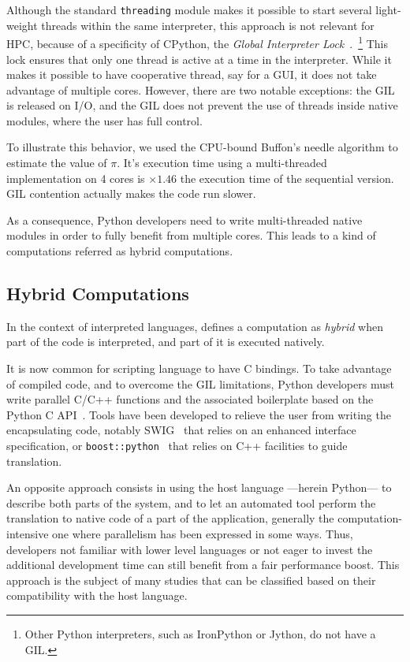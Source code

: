 \documentclass{llncs}
\begin{document}
Although the standard \texttt{threading} module makes it possible to start
several light-weight threads within the same interpreter, this approach is not
relevant for HPC, because of a specificity of CPython, the \emph{Global
Interpreter Lock}~\cite{gil2012}.~\footnote{Other Python interpreters, such as
IronPython or Jython, do not have a GIL.} This lock ensures that only one thread
is active at a time in the interpreter. While it makes it possible to have
cooperative thread, say for a GUI, it does not take advantage of multiple cores.
However, there are two notable exceptions: the GIL is released on I/O, and the
GIL does not prevent the use of threads inside native modules, where the user
has full control.

To illustrate this behavior, we used the CPU-bound Buffon's needle algorithm to
estimate the value of $\pi$. It's execution time using a multi-threaded
implementation on 4 cores is $\times 1.46$ the execution time of the sequential
version. GIL contention actually makes the code run slower. 

As a consequence, Python developers need to write multi-threaded native
modules in order to fully benefit from multiple cores. This leads to a kind of
computations referred as hybrid computations.



\subsection{Hybrid Computations}

In the context of interpreted languages, \cite{dongara2007} defines a computation
as \emph{hybrid} when part of the code is interpreted, and part of it is
executed natively.

It is now common for scripting language to have C bindings. To take advantage of
compiled code, and to overcome the GIL limitations, Python developers must write
parallel C/C++ functions and the associated boilerplate based on the Python C
API~\cite{pythoncapi}. Tools have been developed to relieve the user from
writing the encapsulating code, notably SWIG~\cite{swig2003} that relies on an
enhanced interface specification, or
\texttt{boost::python}~\cite{boostpython2007} that relies on C++ facilities to
guide translation.

An opposite approach consists in using the host language ---herein Python---
to describe both parts of the system, and to let an automated tool perform the
translation to native code of a part of the application, generally the
computation-intensive one where parallelism has been expressed in some ways.
Thus, developers not familiar with lower level languages or not eager to invest
the additional development time can still benefit from a fair performance boost.
This approach is the subject of many studies that can be classified based on
their compatibility with the host language.
\end{document}
